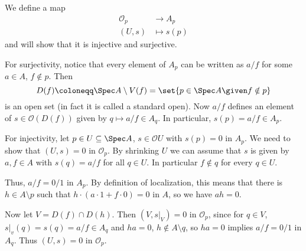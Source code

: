 We define a map
\begin{align*}
	\mathcal{O}_p&\to A_p\\
	(U, s)&\mapsto s(p)
\end{align*}
and will show that it is injective and surjective.

For surjectivity, notice that every element of $A_p$ can be written as
$a/f$ for some $a \in A$, $f \notin p$. Then
\[ D(f)\coloneqq \Spec A\setminus V(f) = \set{p \in \Spec A\given f\notin p} \]
is an open set (in fact it is called a standard open). Now $a/f$ defines an
element of $s \in \mathcal{O}(D(f))$ given by $q\mapsto a/f \in A_q$.
In particular, $s(p) = a/f \in A_p$.

For injectivity, let $p \in U \subseteq \Spec A$, $s \in \mathcal{O}U$ with $s(p) = 0$ in
$A_p$. We need to show that $(U, s) = 0$ in $\mathcal{O}_p$. By shrinking $U$
we can assume that $s$ is given by $a, f \in A$ with $s(q) = a/f$ for all $q \in U$.
In particular $f\notin q$ for every $q \in U$.

Thus, $a/f = 0/1$ in $A_p$. By definition of localization, this means that there
is $h \in A\setminus p$ such that  $h\cdot(a\cdot 1 + f\cdot 0) = 0$ in $A$,
so we have $ah = 0$.

Now let $V = D(f)\cap D(h)$. Then $(V, s|_V) = 0$ in $\mathcal{O}_p$, since
for $q \in V$, $s|_v(q) = s(q) = a/f \in A_q$ and $ha = 0$, $h \notin A\setminus q$,
so $ha = 0$ implies $a/f = 0/1$ in $A_q$. Thus $(U, s) = 0$ in $\mathcal{O}_p$.
